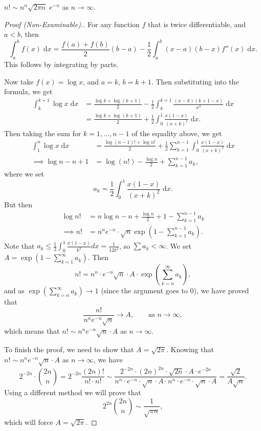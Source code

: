 \documentclass[a4paper]{scrreprt}
\begin{document}
\begin{theorem}
	$n! \sim n^n \sqrt{2 \pi n} \; e^{-n}$ as $n \rightarrow \infty$.
\end{theorem}
\begin{proof}[Proof (Non-Examinable).]
	For any function $f$ that is twice differentiable, and $a < b$, then
	$$
	\int_a^b f(x) \; \mathrm{d}x = \frac{f(a) + f(b)}{2} (b - a) - \frac{1}{2} \int_a^b (x - a)(b - x)f''(x) \; \mathrm{d}x.
	$$
	This follows by integrating by parts.

	Now take $f(x) = \log x$, and $a = k$, $b = k + 1$. Then substituting into the formula, we get
	\begin{align*}
		\int_k^{k + 1} \log x \; \mathrm{d}x &= \frac{\log k + \log(k + 1)}{2} - \frac{1}{2} \int_k^{k + 1} \frac{(x - k)(k + 1 - x)}{x^2} \; \mathrm{d}x 	 \\
		&= \frac{\log k + \log (k + 1)}{2} + \frac{1}{2} \int_0^1 \frac{x(1 - x)}{(x + k)^2} \; \mathrm{d}x.
	\end{align*}
	Then taking the sum for $k = 1, \dots, n - 1$ of the equality above, we get
	\begin{align*}
		\int_1^n \log x \; \mathrm{d}x &= \frac{\log(n - 1)! + \log n!}{2} + \frac{1}{2} \sum_{k = 1}^{n - 1} \int_0^1 \frac{x (1 - x)}{(x + k)^2} \; \mathrm{d}x \\
\implies \log n-n+1 &= \log (n !)-\frac{\log n}{2}+\sum_{k=1}^{n-1} a_{k},
	\end{align*}
	where we set
	$$
	a_{k}=\frac{1}{2} \int_{0}^{1} \frac{x(1-x)}{(x+k)^{2}} \; \mathrm{d} x.
	$$
	But then
	\begin{align*}
		\log n ! &=n \log n-n+\frac{\log n}{2}+1-\sum_{k=1}^{n-1} a_{k} \\
\implies n !&=n^{n} e^{-n} \cdot \sqrt{n} \exp \left(1-\sum_{k=1}^{n-1} a_{k}\right) .
	\end{align*}
	Note that $a_{k} \leqslant \frac{1}{2} \int_{0}^{1} \frac{x(1-x)}{k^{2}} d x=\frac{1}{12 k^{2}}$, so $\sum a_k < \infty$. We set $A=\exp \left(1-\sum_{k=1}^{\infty} a_{k}\right) $. Then
	$$
	n !=n^{n} \cdot e^{-n} \sqrt{n} \cdot A \cdot \exp \left(\sum_{k=n}^{\infty} a_{k}\right),
	$$
	and as $\exp \left(\sum_{k=n}^{\infty} a_{k}\right) \rightarrow 1$ (since the argument goes to 0), we have proved that
	$$
	\frac{n!}{n^n e^{-n} \sqrt{n}} \rightarrow A, \quad \quad \text{as }n \rightarrow \infty,
	$$
	which means that $n! \sim n^n e^{-n} \sqrt{n} \cdot A$ as $n \rightarrow \infty$.

	To finish the proof, we need to show that $A = \sqrt{2 \pi}$.
	Knowing that $n! \sim n^n e^{-n} \sqrt{n} \cdot A$ as $n \rightarrow \infty$, we have
	$$
2^{-2n} \cdot \binom{2n}{n} = 2^{-2n} \frac{(2n)!}{n!\cdot n!} \sim \frac{2^{-2n} \cdot (2n)^{2n} \cdot \sqrt{2n} \cdot A \cdot e^{-2n}}{n^n \cdot e^{-n}\cdot \sqrt{n} \cdot A \cdot n^n \cdot e^{-n} \cdot \sqrt{n} \cdot A} = \frac{\sqrt{2}}{A \sqrt{n}}.
	$$
	Using a different method we will prove that
	$$
	2^{2n} \binom{2n}{n} \sim \frac{1}{\sqrt{\pi n}},
	$$
	which will force $A = \sqrt{2 \pi}$.


\end{proof}
\end{document}

